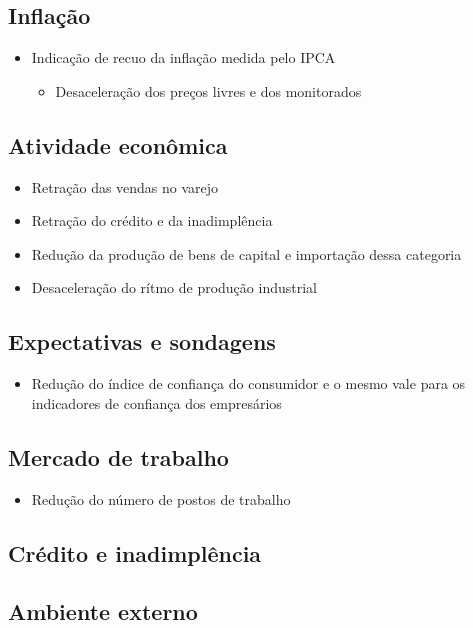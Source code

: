 \documentclass[11pt]{article}
\begin{document}
\subsection*{Inflação}
\label{sec:org6d88167}
\begin{itemize}
\item Indicação de recuo da inflação medida pelo IPCA
\begin{itemize}
\item Desaceleração dos preços livres e dos monitorados
\end{itemize}
\end{itemize}
\subsection*{Atividade econômica}
\label{sec:org93dadb1}
\begin{itemize}
\item Retração das vendas no varejo
\item Retração do crédito e da inadimplência
\item Redução da produção de bens de capital e importação dessa categoria
\item Desaceleração do rítmo de produção industrial
\end{itemize}
\subsection*{Expectativas e sondagens}
\label{sec:org508709e}
\begin{itemize}
\item Redução do índice de confiança do consumidor e o mesmo vale para os indicadores de confiança dos empresários
\end{itemize}
\subsection*{Mercado de trabalho}
\label{sec:org5504b20}
\begin{itemize}
\item Redução do número de postos de trabalho
\end{itemize}
\subsection*{Crédito e inadimplência}
\label{sec:org82101d9}
\subsection*{Ambiente externo}
\label{sec:orgaa4c802}
\end{document}
